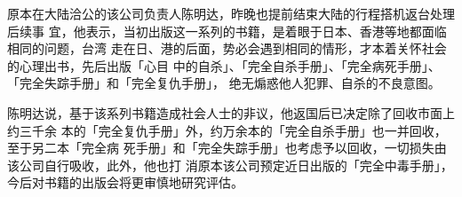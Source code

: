 \documentclass[UTF8]{ctexart}
\begin{document}
原本在大陆洽公的该公司负责人陈明达，昨晚也提前结束大陆的行程搭机返台处理后续事 宜，他表示，当初出版这一系列的书籍，是着眼于日本、香港等地都面临相同的问题，台湾 走在日、港的后面，势必会遇到相同的情形，才本着关怀社会的心理出书，先后出版「心目 中的自杀」、「完全自杀手册」、「完全病死手册」、「完全失踪手册」和「完全复仇手册」， 绝无煽惑他人犯罪、自杀的不良意图。

陈明达说，基于该系列书籍造成社会人士的非议，他返国后已决定除了回收市面上约三千余 本的「完全复仇手册」外，约万余本的「完全自杀手册」也一并回收，至于另二本「完全病 死手册」和「完全失踪手册」也考虑予以回收，一切损失由该公司自行吸收，此外，他也打 消原本该公司预定近日出版的「完全中毒手册」，今后对书籍的出版会将更审慎地研究评估。
\end{document}
